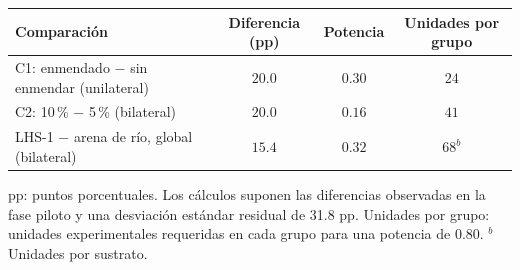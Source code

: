 \begin{tabular}{lccc}
\hline\hline
\textbf{Comparaci\'on} & \textbf{Diferencia (pp)} & \textbf{Potencia} & \textbf{Unidades por grupo} \\
\hline
C1: enmendado $-$ sin enmendar (unilateral) & $20.0$ & $0.30$ & $24$ \\
C2: 10\,\% $-$ 5\,\% (bilateral) & $20.0$ & $0.16$ & $41$ \\
LHS-1 $-$ arena de r\'io, global (bilateral) & $15.4$ & $0.32$ & $68^{b}$ \\
\hline
\end{tabular}
\par\vspace{4pt}
\parbox{0.94\linewidth}{\footnotesize pp: puntos porcentuales. Los c\'alculos suponen las diferencias observadas en la fase piloto y una desviaci\'on est\'andar residual de 31.8 pp. Unidades por grupo: unidades experimentales requeridas en cada grupo para una potencia de 0.80. $^{b}$Unidades por sustrato.}
